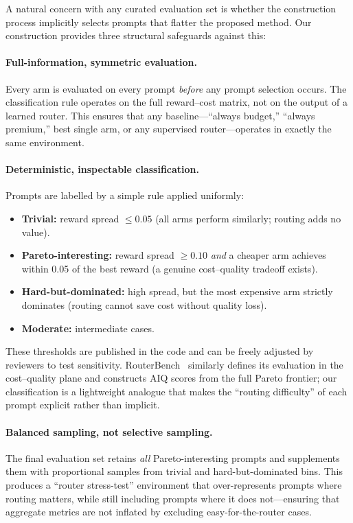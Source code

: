 A natural concern with any curated evaluation set is whether the
construction process implicitly selects prompts that flatter the
proposed method.
Our construction provides three structural safeguards against this:

\paragraph{Full-information, symmetric evaluation.}
Every arm is evaluated on every prompt \emph{before} any prompt
selection occurs.
The classification rule operates on the full reward--cost matrix,
not on the output of a learned router.
This ensures that any baseline---``always budget,'' ``always premium,''
best single arm, or any supervised router---operates in exactly the
same environment.

\paragraph{Deterministic, inspectable classification.}
Prompts are labelled by a simple rule applied uniformly:
\begin{itemize}[nosep,leftmargin=*]
  \item \textbf{Trivial:} reward spread $\leq 0.05$ (all arms perform
    similarly; routing adds no value).
  \item \textbf{Pareto-interesting:} reward spread $\geq 0.10$ \emph{and}
    a cheaper arm achieves within 0.05 of the best reward (a genuine
    cost--quality tradeoff exists).
  \item \textbf{Hard-but-dominated:} high spread, but the most expensive
    arm strictly dominates (routing cannot save cost without quality loss).
  \item \textbf{Moderate:} intermediate cases.
\end{itemize}
These thresholds are published in the code and can be freely adjusted
by reviewers to test sensitivity.
RouterBench~\cite{hu2024routerbench} similarly defines its evaluation
in the cost--quality plane and constructs AIQ scores from the full
Pareto frontier; our classification is a lightweight analogue that makes
the ``routing difficulty'' of each prompt explicit rather than
implicit.

\paragraph{Balanced sampling, not selective sampling.}
The final evaluation set retains \emph{all} Pareto-interesting prompts
and supplements them with proportional samples from trivial and
hard-but-dominated bins.
This produces a ``router stress-test'' environment that over-represents
prompts where routing matters, while still including prompts where it
does not---ensuring that aggregate metrics are not inflated by
excluding easy-for-the-router cases.

